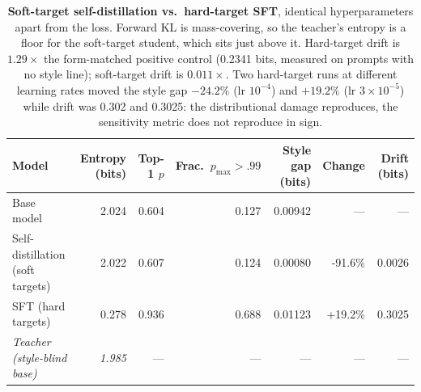 \begin{table}[t]\centering\small
\setlength{\tabcolsep}{4pt}
\begin{tabular}{@{}lrrrrrr@{}}
\toprule
Model & Entropy (bits) & Top-1 $p$ & Frac.\ $p_{\max}>.99$ & Style gap (bits) & Change & Drift (bits) \\
\midrule
Base model & 2.024 & 0.604 & 0.127 & 0.00942 & --- & --- \\
Self-distillation (soft targets) & 2.022 & 0.607 & 0.124 & 0.00080 & -91.6\% & 0.0026 \\
SFT (hard targets) & 0.278 & 0.936 & 0.688 & 0.01123 & +19.2\% & 0.3025 \\
\midrule
\emph{Teacher (style-blind base)} & \emph{1.985} & --- & --- & --- & --- & --- \\
\bottomrule
\end{tabular}
\caption{\textbf{Soft-target self-distillation vs.\ hard-target SFT}, identical hyperparameters apart from the
loss. Forward KL is mass-covering, so the teacher's entropy is a floor for the soft-target student, which sits
just above it. Hard-target drift is $1.29\times$ the form-matched positive control (0.2341 bits, measured on
prompts with no style line); soft-target drift is $0.011\times$. Two hard-target runs at different learning
rates moved the style gap $-24.2\%$ (lr $10^{-4}$) and $+19.2\%$ (lr $3\times10^{-5}$) while drift was 0.302
and 0.3025: the distributional damage reproduces, the sensitivity metric does not reproduce in sign.}
\label{tab:objective}
\end{table}